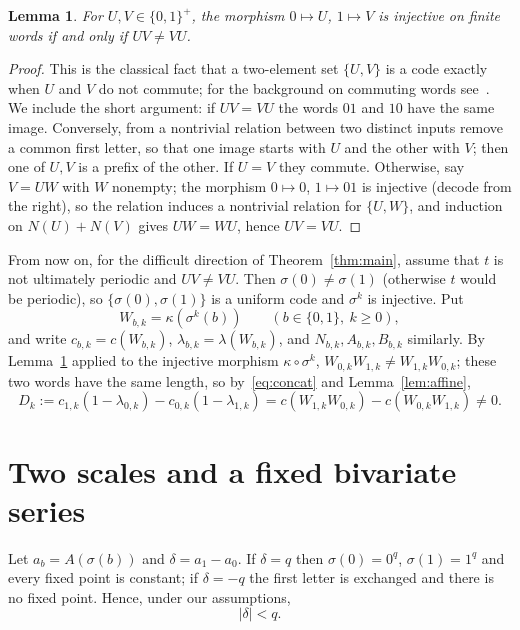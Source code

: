 \documentclass[11pt]{amsart}
\newtheorem{lemma}[theorem]{Lemma}
\theoremstyle{remark}
\theoremstyle{definition}
\numberwithin{equation}{section}
\begin{document}
\begin{lemma}\label{lem:code}
For $U,V\in\{0,1\}^+$, the morphism $0\mapsto U$, $1\mapsto V$ is injective on finite words if and only if $UV\ne VU$.
\end{lemma}

\begin{proof}
This is the classical fact that a two-element set $\{U,V\}$ is a code exactly when $U$ and $V$ do not commute; for the background on commuting words see~\cite[Chapter~1]{Lothaire}. We include the short argument: if $UV=VU$ the words $01$ and $10$ have the same image. Conversely, from a nontrivial relation between two distinct inputs remove a common first letter, so that one image starts with $U$ and the other with $V$; then one of $U,V$ is a prefix of the other. If $U=V$ they commute. Otherwise, say $V=UW$ with $W$ nonempty; the morphism $0\mapsto0$, $1\mapsto01$ is injective (decode from the right), so the relation induces a nontrivial relation for $\{U,W\}$, and induction on $N(U)+N(V)$ gives $UW=WU$, hence $UV=VU$.
\end{proof}

From now on, for the difficult direction of Theorem~\ref{thm:main}, assume that $t$ is not ultimately periodic and $UV\ne VU$. Then $\sigma(0)\ne\sigma(1)$ (otherwise $t$ would be periodic), so $\{\sigma(0),\sigma(1)\}$ is a uniform code and $\sigma^k$ is injective. Put
\[
W_{b,k}=\kappa(\sigma^k(b))\qquad(b\in\{0,1\},\ k\ge0),
\]
and write $c_{b,k}=c(W_{b,k})$, $\lambda_{b,k}=\lambda(W_{b,k})$, and $N_{b,k},A_{b,k},B_{b,k}$ similarly. By Lemma~\ref{lem:code} applied to the injective morphism $\kappa\circ\sigma^k$, $W_{0,k}W_{1,k}\ne W_{1,k}W_{0,k}$; these two words have the same length, so by~\eqref{eq:concat} and Lemma~\ref{lem:affine},
\begin{equation}\label{eq:D}
D_k:=c_{1,k}(1-\lambda_{0,k})-c_{0,k}(1-\lambda_{1,k})=c(W_{1,k}W_{0,k})-c(W_{0,k}W_{1,k})\ne0 .
\end{equation}

\section{Two scales and a fixed bivariate series}\label{sec:series}

Let $a_b=A(\sigma(b))$ and $\delta=a_1-a_0$. If $\delta=q$ then $\sigma(0)=0^q$, $\sigma(1)=1^q$ and every fixed point is constant; if $\delta=-q$ the first letter is exchanged and there is no fixed point. Hence, under our assumptions,
\begin{equation}\label{eq:delta}
|\delta|<q .
\end{equation}
\end{document}
